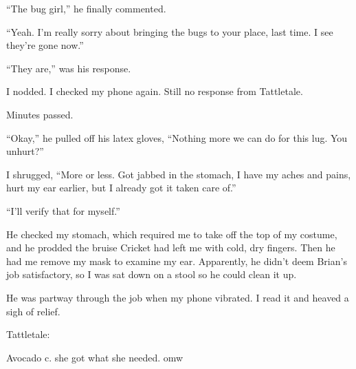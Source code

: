 ``The bug girl,'' he finally commented.



``Yeah.  I'm really sorry about bringing the bugs to your place, last time.  I see they're gone now.''



``They are,'' was his response.



I nodded.  I checked my phone again.  Still no response from Tattletale.



Minutes passed.



``Okay,'' he pulled off his latex gloves, ``Nothing more we can do for this lug.  You unhurt?''



I shrugged, ``More or less.  Got jabbed in the stomach, I have my aches and pains, hurt my ear earlier, but I already got it taken care of.''



``I'll verify that for myself.''



He checked my stomach, which required me to take off the top of my costume, and he prodded the bruise Cricket had left me with cold, dry fingers.  Then he had me remove my mask to examine my ear.  Apparently, he didn't deem Brian's job satisfactory, so I was sat down on a stool so he could clean it up.



He was partway through the job when my phone vibrated.  I read it and heaved a sigh of relief.



Tattletale:



Avocado c.  she got what she needed.  omw





